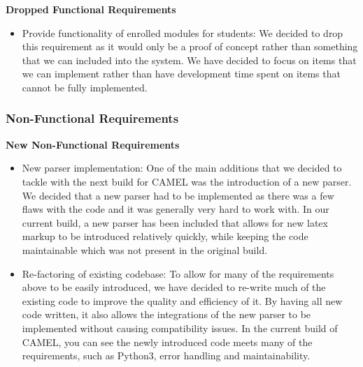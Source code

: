 	\textbf{Dropped Functional Requirements}
	\begin{itemize}
		\item Provide functionality of enrolled modules for students: We decided to drop this requirement as it would only be a proof of concept rather than something that we can included into the system. We have decided to focus on items that we can implement rather than have development time spent on items that cannot be fully implemented.  
	\end{itemize}
		
	\subsubsection{Non-Functional Requirements}
	\textbf{New Non-Functional Requirements}
	\begin{itemize}
		
		\item New parser implementation: One of the main additions that we decided to tackle with the next build for CAMEL was the introduction of a new parser. We decided that a new parser had to be implemented as there was a few flaws with the code and it was generally very hard to work with. In our current build, a new parser has been included that allows for new latex markup to be introduced relatively quickly, while keeping the code maintainable which was not present in the original build.    
		
		\item Re-factoring of existing codebase: To allow for many of the requirements above to be easily introduced, we have decided to re-write much of the existing code to improve the quality and efficiency of it. By having all new code written, it also allows the integrations of the new parser to be implemented without causing compatibility issues. In the current build of CAMEL, you can see the newly introduced code meets many of the requirements, such as Python3, error handling and maintainability. 
	\end{itemize}
	
